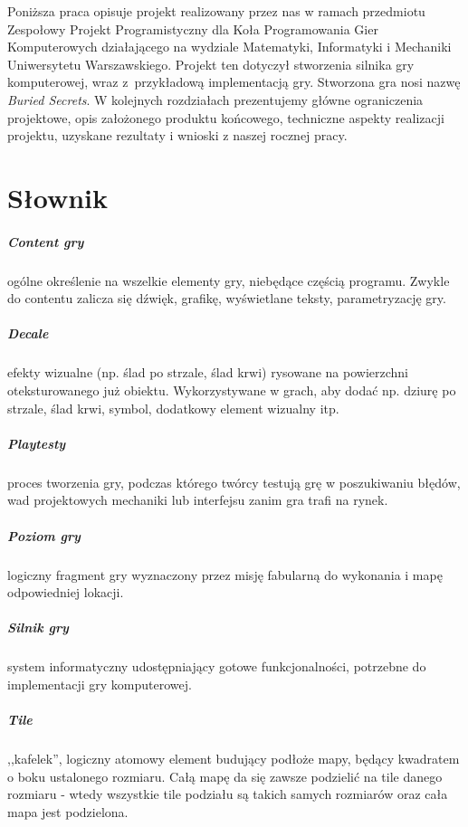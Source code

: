 \documentclass[licencjacka]{pracamgr}
\begin{document}
  Poniższa praca opisuje projekt realizowany przez nas w ramach przedmiotu Zespołowy Projekt Programistyczny dla 
  Koła Programowania Gier Komputerowych działającego na wydziale Matematyki, Informatyki i Mechaniki Uniwersytetu Warszawskiego.
  Projekt ten dotyczył stworzenia silnika gry komputerowej, wraz z~przykładową implementacją gry. Stworzona gra nosi nazwę
  \emph{Buried Secrets}. W kolejnych rozdziałach prezentujemy główne ograniczenia projektowe, opis założonego produktu końcowego,
  techniczne aspekty realizacji projektu, uzyskane rezultaty i wnioski z naszej rocznej pracy.


\chapter{Słownik}
  \paragraph{Content gry} ogólne określenie na wszelkie elementy gry, niebędące częścią programu. Zwykle do contentu zalicza się
    dźwięk, grafikę, wyświetlane teksty, parametryzację gry.
  \paragraph{Decale} efekty wizualne (np. ślad po strzale, ślad krwi) rysowane na powierzchni oteksturowanego już obiektu.
    Wykorzystywane w grach, aby dodać np. dziurę po strzale, ślad krwi, symbol, dodatkowy element wizualny itp.
  \paragraph{Playtesty} proces tworzenia gry, podczas którego twórcy testują grę w poszukiwaniu błędów, wad projektowych mechaniki
    lub interfejsu zanim gra trafi na rynek.
  \paragraph{Poziom gry} logiczny fragment gry wyznaczony przez misję fabularną do wykonania i mapę odpowiedniej lokacji.
  \paragraph{Silnik gry} system informatyczny udostępniający gotowe funkcjonalności, potrzebne do implementacji gry komputerowej.
  \paragraph{Tile} ,,kafelek'', logiczny atomowy element budujący podłoże mapy, będący kwadratem o boku ustalonego rozmiaru. Całą
    mapę da się zawsze podzielić na tile danego rozmiaru - wtedy wszystkie tile podziału są takich samych rozmiarów oraz
    cała mapa jest podzielona.
\end{document}
